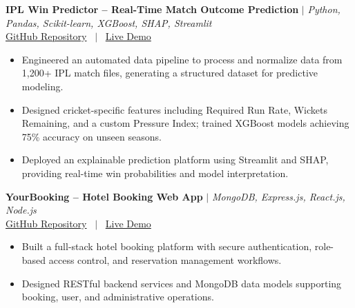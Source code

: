 \documentclass[10pt, a4paper]{article}
\begin{document}
\textbf{IPL Win Predictor -- Real-Time Match Outcome Prediction} $|$ \textit{Python, Pandas, Scikit-learn, XGBoost, SHAP, Streamlit} \\

\small{
\href{https://github.com/PankajKumar-11/IPL-Win-Predictor}{GitHub Repository}
 \ $|$ \ \href{https://demo.example.com}{Live Demo}
} \\

\begin{itemize}

    \item Engineered an automated data pipeline to process and normalize data from 1,200+ IPL match files, generating a structured dataset for predictive modeling.

    \item Designed cricket-specific features including Required Run Rate, Wickets Remaining, and a custom Pressure Index; trained XGBoost models achieving 75\% accuracy on unseen seasons.

    \item Deployed an explainable prediction platform using Streamlit and SHAP, providing real-time win probabilities and model interpretation.

\end{itemize}
\vspace{2pt}

\textbf{YourBooking -- Hotel Booking Web App} $|$ \textit{MongoDB, Express.js, React.js, Node.js} \\

\small{
\href{https://github.com/PankajKumar-11/YourBooking}{GitHub Repository}
 \ $|$ \ \href{https://demo.example.com}{Live Demo}
} \\

\begin{itemize}

    \item Built a full-stack hotel booking platform with secure authentication, role-based access control, and reservation management workflows.

    \item Designed RESTful backend services and MongoDB data models supporting booking, user, and administrative operations.

\end{itemize}
\vspace{2pt}


\end{document}
